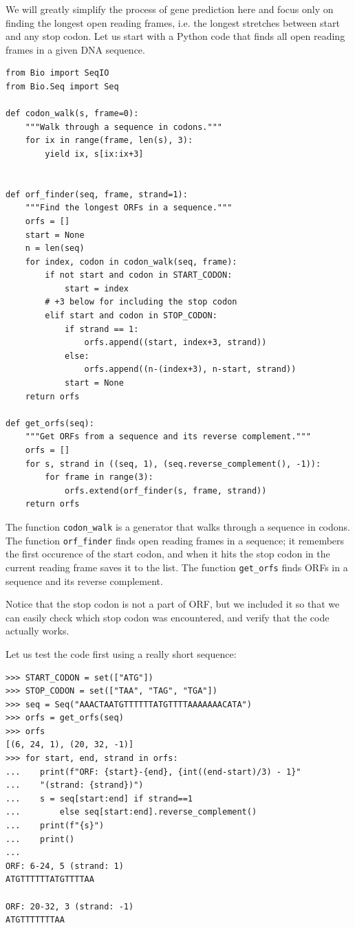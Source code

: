 We will greatly simplify the process of gene prediction here and focus only on finding the longest open reading frames, i.e. the longest stretches between start and any stop codon. Let us start with a Python code that finds all open reading frames in a given DNA sequence.

\vspace*{3mm}
\begin{lstlisting}
from Bio import SeqIO
from Bio.Seq import Seq

def codon_walk(s, frame=0):
    """Walk through a sequence in codons."""
    for ix in range(frame, len(s), 3):
        yield ix, s[ix:ix+3]


def orf_finder(seq, frame, strand=1):
    """Find the longest ORFs in a sequence."""
    orfs = []
    start = None
    n = len(seq)
    for index, codon in codon_walk(seq, frame):
        if not start and codon in START_CODON:
            start = index
        # +3 below for including the stop codon
        elif start and codon in STOP_CODON:
            if strand == 1:
                orfs.append((start, index+3, strand))
            else:
                orfs.append((n-(index+3), n-start, strand))
            start = None
    return orfs

def get_orfs(seq):
    """Get ORFs from a sequence and its reverse complement."""
    orfs = []
    for s, strand in ((seq, 1), (seq.reverse_complement(), -1)):
        for frame in range(3):
            orfs.extend(orf_finder(s, frame, strand))
    return orfs
\end{lstlisting}

The function \texttt{codon\_walk} is a generator that walks through a sequence in codons. The function \texttt{orf\_finder} finds open reading frames in a sequence; it remembers the first occurence of the start codon, and when it hits the stop codon in the current reading frame saves it to the list. The function \texttt{get\_orfs} finds ORFs in a sequence and its reverse complement.

Notice that the stop codon is not a part of ORF, but we included it so that we can easily check which stop codon was encountered, and verify that the code actually works.

Let us test the code first using a really short sequence:

\vspace*{3mm}
\begin{lstlisting}
>>> START_CODON = set(["ATG"])
>>> STOP_CODON = set(["TAA", "TAG", "TGA"])
>>> seq = Seq("AAACTAATGTTTTTTATGTTTTAAAAAAACATA")
>>> orfs = get_orfs(seq)
>>> orfs
[(6, 24, 1), (20, 32, -1)]
>>> for start, end, strand in orfs:
...    print(f"ORF: {start}-{end}, {int((end-start)/3) - 1}"
...    "(strand: {strand})")
...    s = seq[start:end] if strand==1 
...        else seq[start:end].reverse_complement()
...    print(f"{s}")
...    print()
...
ORF: 6-24, 5 (strand: 1)
ATGTTTTTTATGTTTTAA

ORF: 20-32, 3 (strand: -1)
ATGTTTTTTTAA
\end{lstlisting}

